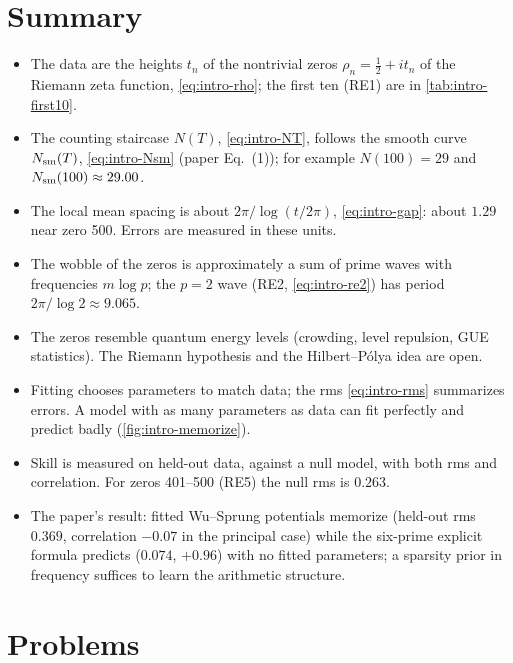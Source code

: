 \section{Summary}\label{sec:intro-summary}

\begin{itemize}
\item The data are the heights $t_n$ of the nontrivial zeros $\rho_n = \tfrac12 + i t_n$ of the Riemann zeta function, \cref{eq:intro-rho}; the first ten (RE1) are in \cref{tab:intro-first10}.
\item The counting staircase $N(T)$, \cref{eq:intro-NT}, follows the smooth curve $N_{\mathrm{sm}}(T)$, \cref{eq:intro-Nsm} (paper Eq.~(1)); for example $N(100) = 29$ and $N_{\mathrm{sm}}(100) \approx 29.00$.
\item The local mean spacing is about $2\pi/\log(t/2\pi)$, \cref{eq:intro-gap}: about $1.29$ near zero 500. Errors are measured in these units.
\item The wobble of the zeros is approximately a sum of prime waves with frequencies $m\log p$; the $p=2$ wave (RE2, \cref{eq:intro-re2}) has period $2\pi/\log 2 \approx 9.065$.
\item The zeros resemble quantum energy levels (crowding, level repulsion, GUE statistics). The Riemann hypothesis and the Hilbert--P\'olya idea are open.
\item Fitting chooses parameters to match data; the rms \cref{eq:intro-rms} summarizes errors. A model with as many parameters as data can fit perfectly and predict badly (\cref{fig:intro-memorize}).
\item Skill is measured on held-out data, against a null model, with both rms and correlation. For zeros 401--500 (RE5) the null rms is $0.263$.
\item The paper's result: fitted Wu--Sprung potentials memorize (held-out rms $0.369$, correlation $-0.07$ in the principal case) while the six-prime explicit formula predicts ($0.074$, $+0.96$) with no fitted parameters; a sparsity prior in frequency suffices to learn the arithmetic structure.
\end{itemize}

\section{Problems}\label{sec:intro-problems}

